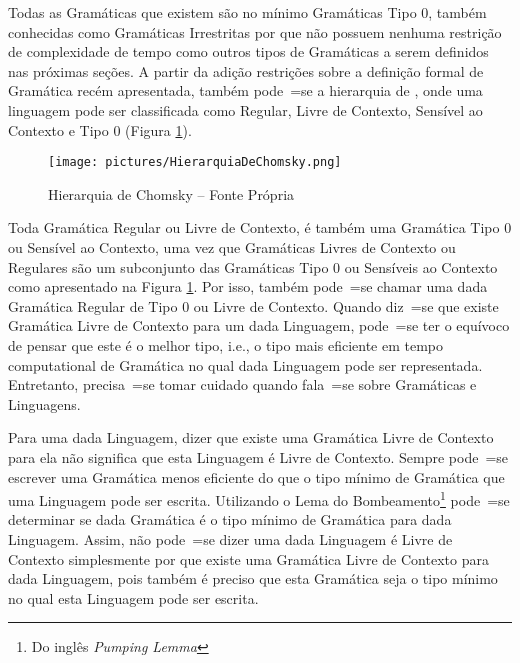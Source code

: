 {    Todas as Gramáticas que existem são no mínimo Gramáticas Tipo 0,
    também conhecidas como Gramáticas Irrestritas por que não possuem
    nenhuma restrição de complexidade de tempo como outros tipos de
    Gramáticas a serem definidos nas próximas seções{}.
    A partir da adição restrições sobre a definição formal de Gramática recém apresentada,
    também pode~=se  a hierarquia de
    ,
    onde uma linguagem pode ser classificada como Regular,
    Livre de Contexto,
    Sensível ao Contexto e
    Tipo 0 (Figura \ref{fig:pictures/HierarquiaDeChomsky.png}).
    \begin{figure}[H]
    \centering
    \texttt{[image: pictures/HierarquiaDeChomsky.png]}
    \caption{Hierarquia de Chomsky -- Fonte Própria }
    \label{fig:pictures/HierarquiaDeChomsky.png}
    \end{figure}

    Toda Gramática Regular ou Livre de Contexto,
    é também uma Gramática Tipo 0 ou Sensível ao Contexto,
    uma vez que Gramáticas Livres de Contexto ou Regulares são um
    subconjunto das Gramáticas Tipo 0 ou Sensíveis ao Contexto como
    apresentado na Figura \ref{fig:pictures/HierarquiaDeChomsky.png}.
    Por isso,
    também pode~=se chamar uma dada Gramática Regular de Tipo 0 ou Livre de Contexto.
    Quando diz~=se que existe Gramática Livre de Contexto para um dada Linguagem,
    pode~=se ter o equívoco de pensar que este é o melhor tipo,
    i.e.,
    o tipo mais eficiente em tempo computational de Gramática
    no qual dada Linguagem pode ser representada.
    Entretanto,
    precisa~=se tomar cuidado quando fala~=se sobre Gramáticas e
    Linguagens.

    Para uma dada Linguagem,
    dizer que existe uma Gramática Livre de Contexto para ela
    não significa que esta Linguagem é Livre de Contexto.
    Sempre pode~=se escrever uma Gramática menos eficiente do que o
    tipo mínimo de Gramática que uma Linguagem pode ser escrita.
    Utilizando o Lema do Bombeamento\footnote{Do inglês \textit{Pumping
    Lemma}} \cite{hopcroftBook,sipserBook} pode~=se determinar se
    dada Gramática é o tipo mínimo de Gramática para dada Linguagem.
    Assim,
    não pode~=se dizer uma dada Linguagem é Livre de Contexto simplesmente
    por que existe uma Gramática Livre de Contexto para dada Linguagem,
    pois também é preciso que esta Gramática seja o tipo
    mínimo no qual esta Linguagem pode ser escrita.


}

